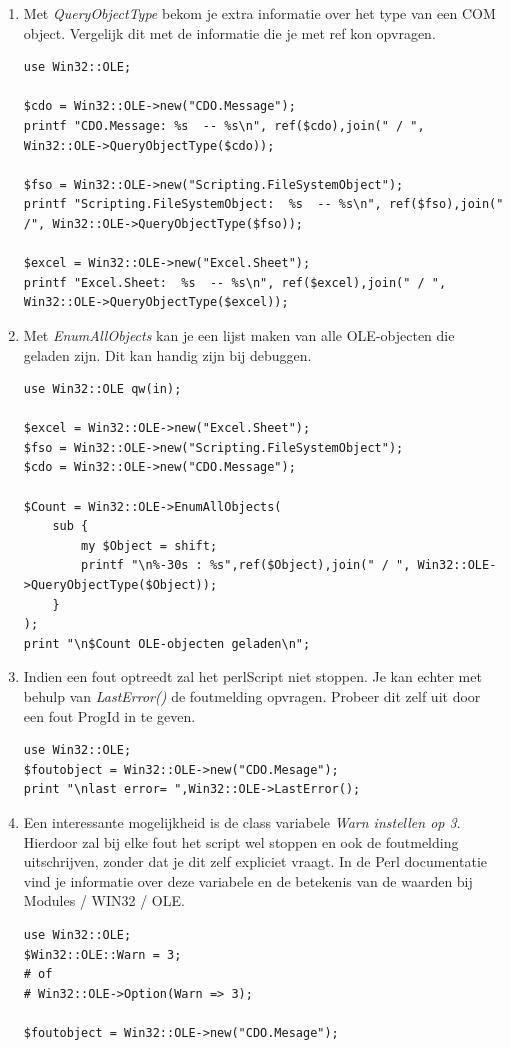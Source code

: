 \documentclass[11pt,a4paper]{report}
\begin{document}
\begin{enumerate}[resume]
	\item Met \textit{QueryObjectType} bekom je extra informatie over het type van een COM object. Vergelijk dit met de informatie die je met ref kon opvragen.
	\begin{lstlisting}
use Win32::OLE;

$cdo = Win32::OLE->new("CDO.Message");
printf "CDO.Message: %s  -- %s\n", ref($cdo),join(" / ", Win32::OLE->QueryObjectType($cdo));

$fso = Win32::OLE->new("Scripting.FileSystemObject");
printf "Scripting.FileSystemObject:  %s  -- %s\n", ref($fso),join(" /", Win32::OLE->QueryObjectType($fso));

$excel = Win32::OLE->new("Excel.Sheet");
printf "Excel.Sheet:  %s  -- %s\n", ref($excel),join(" / ", Win32::OLE->QueryObjectType($excel));
	\end{lstlisting}
	\item Met \textit{EnumAllObjects} kan je een lijst maken van alle OLE-objecten die geladen zijn. Dit kan handig zijn bij debuggen.
\begin{lstlisting}
use Win32::OLE qw(in);

$excel = Win32::OLE->new("Excel.Sheet");
$fso = Win32::OLE->new("Scripting.FileSystemObject");
$cdo = Win32::OLE->new("CDO.Message");

$Count = Win32::OLE->EnumAllObjects(
	sub {
		my $Object = shift;
		printf "\n%-30s : %s",ref($Object),join(" / ", Win32::OLE->QueryObjectType($Object));
	}
);
print "\n$Count OLE-objecten geladen\n";
\end{lstlisting}
\newpage
	\item Indien een fout optreedt zal het perlScript niet stoppen. Je kan echter met behulp van \textit{LastError()} de foutmelding opvragen. Probeer dit zelf uit door een fout ProgId in te geven.
\begin{lstlisting}
use Win32::OLE;
$foutobject = Win32::OLE->new("CDO.Mesage");
print "\nlast error= ",Win32::OLE->LastError();
\end{lstlisting}
	\item Een interessante mogelijkheid is de class variabele \textit{Warn instellen op 3}. Hierdoor zal bij elke fout het script wel stoppen en ook de foutmelding uitschrijven, zonder dat je dit zelf expliciet vraagt. In de Perl documentatie vind je informatie over deze variabele en de betekenis van de waarden bij Modules / WIN32 / OLE.
\begin{lstlisting}
use Win32::OLE;
$Win32::OLE::Warn = 3;
# of
# Win32::OLE->Option(Warn => 3);

$foutobject = Win32::OLE->new("CDO.Mesage");
\end{lstlisting}
\end{enumerate}
\end{document}
